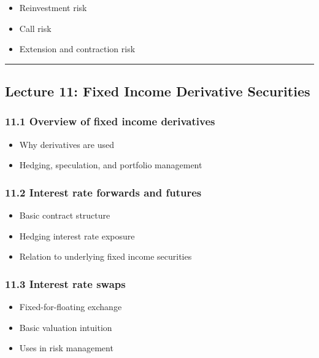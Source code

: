 \documentclass[
  letterpaper,
  DIV=11,
  numbers=noendperiod]{scrartcl}
\providecommand{\tightlist}{%
  \setlength{\itemsep}{0pt}\setlength{\parskip}{0pt}}
\begin{document}
\begin{itemize}
\tightlist
\item
  Reinvestment risk
\item
  Call risk
\item
  Extension and contraction risk
\end{itemize}

\begin{center}\rule{0.5\linewidth}{0.5pt}\end{center}

\subsection{Lecture 11: Fixed Income Derivative
Securities}\label{lecture-11-fixed-income-derivative-securities}

\subsubsection{11.1 Overview of fixed income
derivatives}\label{overview-of-fixed-income-derivatives}

\begin{itemize}
\tightlist
\item
  Why derivatives are used
\item
  Hedging, speculation, and portfolio management
\end{itemize}

\subsubsection{11.2 Interest rate forwards and
futures}\label{interest-rate-forwards-and-futures}

\begin{itemize}
\tightlist
\item
  Basic contract structure
\item
  Hedging interest rate exposure
\item
  Relation to underlying fixed income securities
\end{itemize}

\subsubsection{11.3 Interest rate swaps}\label{interest-rate-swaps}

\begin{itemize}
\tightlist
\item
  Fixed-for-floating exchange
\item
  Basic valuation intuition
\item
  Uses in risk management
\end{itemize}
\end{document}
